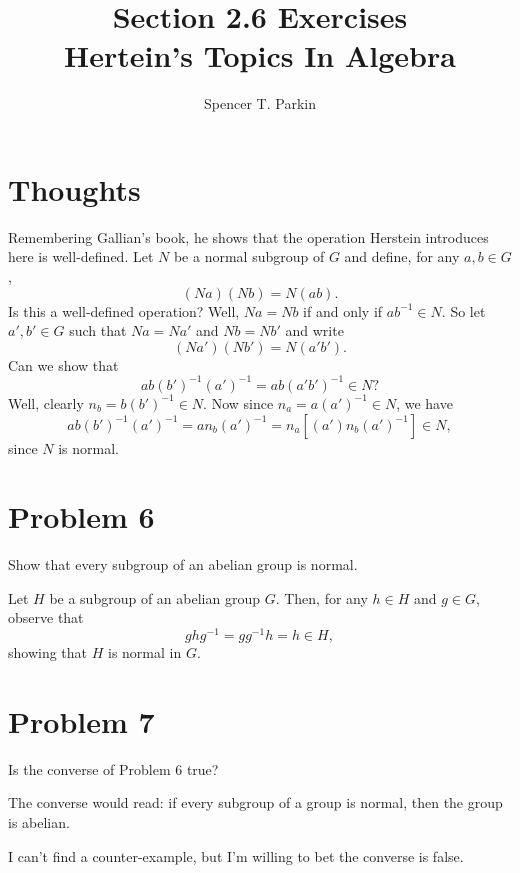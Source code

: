 \documentclass[12pt]{article}
\title{Section 2.6 Exercises\\Hertein's Topics In Algebra}
\author{Spencer T. Parkin}
\begin{document}
\maketitle

\section*{Thoughts}

Remembering Gallian's book, he shows that the operation Herstein introduces here is well-defined.
Let $N$ be a normal subgroup of $G$ and define, for any $a,b\in G$,
\begin{equation*}
(Na)(Nb)=N(ab).
\end{equation*}
Is this a well-defined operation?  Well, $Na=Nb$ if and only if $ab^{-1}\in N$.
So let $a',b'\in G$ such that $Na=Na'$ and $Nb=Nb'$ and write
\begin{equation*}
(Na')(Nb') = N(a'b').
\end{equation*}
Can we show that
\begin{equation*}
ab(b')^{-1}(a')^{-1} = ab(a'b')^{-1}\in N?
\end{equation*}
Well, clearly $n_b=b(b')^{-1}\in N$.  Now since $n_a=a(a')^{-1}\in N$,
we have
\begin{equation*}
ab(b')^{-1}(a')^{-1} = an_b(a')^{-1} = n_a[(a')n_b(a')^{-1}]\in N,
\end{equation*}
since $N$ is normal.

\section*{Problem 6}

Show that every subgroup of an abelian group is normal.

Let $H$ be a subgroup of an abelian group $G$.
Then, for any $h\in H$ and $g\in G$, observe that
\begin{equation*}
ghg^{-1}=gg^{-1}h = h\in H,
\end{equation*}
showing that $H$ is normal in $G$.

\section*{Problem 7}

Is the converse of Problem 6 true?

The converse would read: if every subgroup of a group is normal, then the group is abelian.

I can't find a counter-example, but I'm willing to bet the converse is false.
\end{document}
